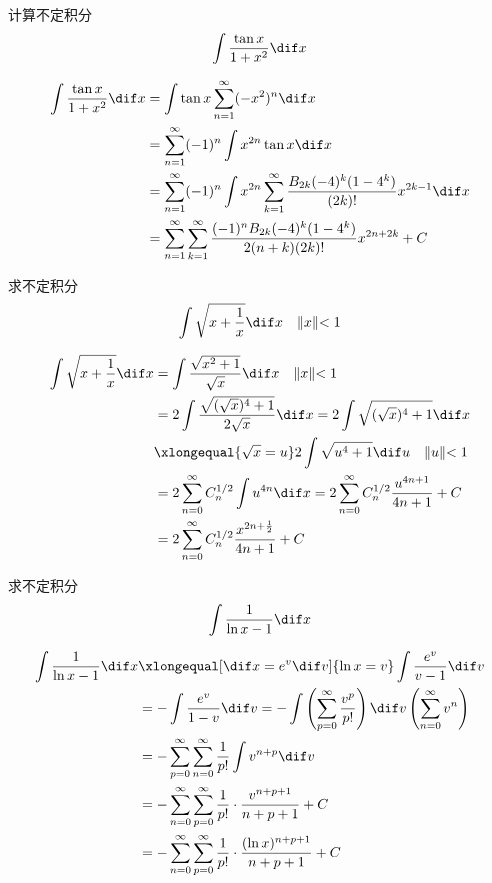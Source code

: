 \documentclass[color=green,titlestyle=hang]{elegantbook}%
\begin{document}
\begin{exercise}
计算不定积分\[\int\frac{\tan x}{1+x^2}\dif x\]
\end{exercise}\begin{solution}
\begin{align*}
\int\frac{\tan x}{1+x^2}\dif x
&=\int\tan x\sum_{n=1}^{\infty}(-x^2)^n\dif x\\
&=\sum_{n=1}^{\infty}(-1)^n\int x^{2n}\tan x\dif x\\
&=\sum_{n=1}^{\infty}(-1)^n\int x^{2n}\sum_{k=1}^{\infty}\frac{B_{2k}(-4)^k(1-4^k)}{(2k)!}x^{2k-1}\dif x\\
&=\sum_{n=1}^{\infty}\sum_{k=1}^{\infty}\frac{(-1)^nB_{2k}(-4)^k(1-4^k)}{2(n+k)(2k)!}x^{2n+2k}+C
\end{align*}	
\end{solution}

\begin{exercise}求不定积分\[\int\sqrt{x+\frac{1}{x}}\dif x\quad \lVert x\lVert<1\]
\end{exercise}\begin{Solution}
\begin{align*}
\int\sqrt{x+\frac{1}{x}}\dif x&=\int\frac{\sqrt{x^2+1}}{\sqrt x}\dif x\quad \lVert x\lVert<1\\
&=2\int\frac{\sqrt{(\sqrt{x})^4+1}}{2\sqrt{x}}\dif x=2\int\sqrt{(\sqrt{x})^4+1}\dif x\\
&\xlongequal{\sqrt{x}=u}2\int\sqrt{u^4+1}\dif u\quad \lVert u\lVert<1\\
&=2\sum_{n=0}^{\infty}C_n^{1/2}\int u^{4n}\dif x=2\sum_{n=0}^{\infty}C_n^{1/2}\frac{u^{4n+1}}{4n+1}+C\\
&=2\sum_{n=0}^{\infty}C_n^{1/2}\frac{x^{2n+\frac{1}{2}}}{4n+1}+C
\end{align*}
\end{Solution}

\begin{example}
求不定积分\[\int\frac{1}{\ln x-1}\dif x\]
\end{example}\begin{Solution}
\begin{align*}
\int\frac{1}{\ln x-1}\dif x&\xlongequal[\dif x=e^v\dif v]{\ln x=v}\int\frac{e^v}{v-1}\dif v\\
&=-\int\frac{e^v}{1-v}\dif v=-\int\left(\sum_{p=0}^{\infty}\frac{v^p}{p!}\right)\dif v
\left(\sum_{n=0}^{\infty}v^n\right)\\
&=-\sum_{p=0}^{\infty}\sum_{n=0}^{\infty}\frac{1}{p!}\int v^{n+p}\dif v\\
&=-\sum_{n=0}^{\infty}\sum_{p=0}^{\infty}\frac{1}{p!}\cdot\frac{v^{n+p+1}}{n+p+1}+C\\
&=-\sum_{n=0}^{\infty}\sum_{p=0}^{\infty}\frac{1}{p!}\cdot\frac{(\ln x)^{n+p+1}}{n+p+1}+C
\end{align*}
\end{Solution}
\end{document}
